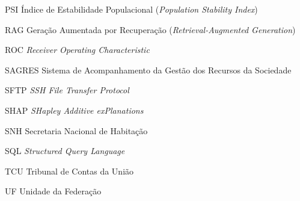 \begin{siglas}
  \item[PSI] Índice de Estabilidade Populacional (\textit{Population Stability Index})
  \item[RAG] Geração Aumentada por Recuperação (\textit{Retrieval-Augmented Generation})
  \item[ROC] \textit{Receiver Operating Characteristic}
  \item[SAGRES] Sistema de Acompanhamento da Gestão dos Recursos da Sociedade
  \item[SFTP] \textit{SSH File Transfer Protocol}
  \item[SHAP] \textit{SHapley Additive exPlanations}
  \item[SNH] Secretaria Nacional de Habitação
  \item[SQL] \textit{Structured Query Language}
  \item[TCU] Tribunal de Contas da União
  \item[UF] Unidade da Federação
\end{siglas}
